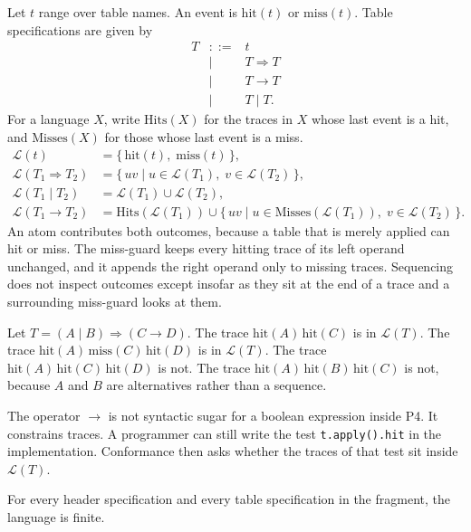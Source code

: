 \documentclass[a4paper,UKenglish,cleveref,autoref]{lipics-v2021}
\begin{document}
Let \(t\) range over table names.
An event is \(\mathrm{hit}(t)\) or \(\mathrm{miss}(t)\).
Table specifications are given by
\[
\begin{array}{rcl}
T & ::= & t \\
  & \mid & T \Rightarrow T \\
  & \mid & T \rightarrow T \\
  & \mid & T \mathrel{\vert} T .
\end{array}
\]
For a language \(X\), write \(\mathrm{Hits}(X)\) for the traces in \(X\) whose last event is a hit, and \(\mathrm{Misses}(X)\) for those whose last event is a miss.
\begin{align*}
  \mathcal{L}(t) &= \{\, \mathrm{hit}(t),\; \mathrm{miss}(t) \,\}, \\
  \mathcal{L}(T_1 \Rightarrow T_2) &= \{\, uv \mid u \in \mathcal{L}(T_1),\; v \in \mathcal{L}(T_2) \,\}, \\
  \mathcal{L}(T_1 \mid T_2) &= \mathcal{L}(T_1) \cup \mathcal{L}(T_2), \\
  \mathcal{L}(T_1 \rightarrow T_2) &= \mathrm{Hits}(\mathcal{L}(T_1)) \cup \{\, uv \mid u \in \mathrm{Misses}(\mathcal{L}(T_1)),\; v \in \mathcal{L}(T_2) \,\}.
\end{align*}
An atom contributes both outcomes, because a table that is merely applied can hit or miss.
The miss-guard keeps every hitting trace of its left operand unchanged, and it appends the right operand only to missing traces.
Sequencing does not inspect outcomes except insofar as they sit at the end of a trace and a surrounding miss-guard looks at them.

\begin{example}
\label{ex:tables}
Let \(T = (A \mid B) \Rightarrow (C \rightarrow D)\).
The trace \(\mathrm{hit}(A)\,\mathrm{hit}(C)\) is in \(\mathcal{L}(T)\).
The trace \(\mathrm{hit}(A)\,\mathrm{miss}(C)\,\mathrm{hit}(D)\) is in \(\mathcal{L}(T)\).
The trace \(\mathrm{hit}(A)\,\mathrm{hit}(C)\,\mathrm{hit}(D)\) is not.
The trace \(\mathrm{hit}(A)\,\mathrm{hit}(B)\,\mathrm{hit}(C)\) is not, because \(A\) and \(B\) are alternatives rather than a sequence.
\end{example}

The operator \(\rightarrow\) is not syntactic sugar for a boolean expression inside P4.
It constrains traces.
A programmer can still write the test \texttt{t.apply().hit} in the implementation.
Conformance then asks whether the traces of that test sit inside \(\mathcal{L}(T)\).

\begin{proposition}
\label{prop:finite}
For every header specification and every table specification in the fragment, the language is finite.
\end{proposition}
\end{document}
